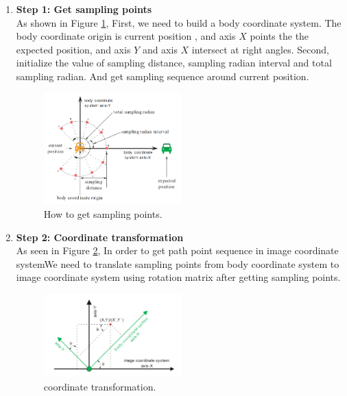 \begin{enumerate}
    \item \textbf{Step 1: Get sampling points}\\
    As shown in Figure \ref{samplings}, First, we need to build a body coordinate system. The body coordinate origin is current position , and axis $X$ points the the expected position, and axis $Y$ and axis $X$ intersect at right angles. Second, initialize the value of sampling distance, sampling radian interval and total sampling radian. And get sampling sequence around current position.
    
    \begin{figure}[thb]
        \centering
        \includegraphics[width=0.5\textwidth]{images/PathPlaningSampling.png}
        \caption[How to find the path point]{How to get sampling points.}\label{samplings}
    \end{figure}
    
    \item \textbf{Step 2: Coordinate transformation}\\
    As seen in Figure \ref{transformation}, In order to get path point sequence in image coordinate systemWe need to translate sampling points from body coordinate system to image coordinate system using rotation matrix after getting sampling points.
    
    \begin{figure}[thb]
        \centering
        \includegraphics[width=0.5\textwidth]{images/PathPlaningRotationMarix.png}
        \caption[coordinate transformation]{coordinate transformation.}\label{transformation}
    \end{figure}
    

\end{enumerate}
